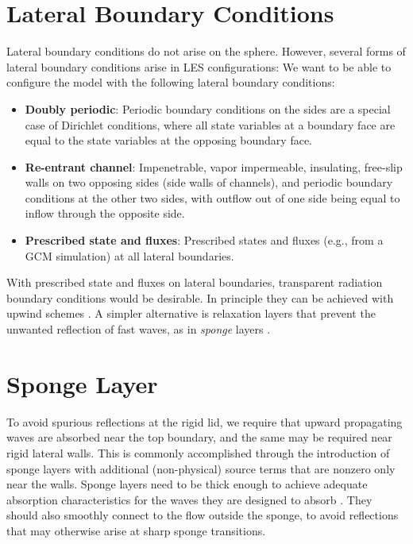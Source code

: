 \documentclass{report}
\begin{document}
\section{Lateral Boundary Conditions}

Lateral boundary conditions do not arise on the sphere. However, several forms of lateral boundary conditions arise in LES configurations: We want to be able to configure the model with the following lateral boundary conditions:
\begin{itemize}
    \item \textbf{Doubly periodic}: Periodic boundary conditions on the sides are a special case of Dirichlet conditions, where all state variables at a boundary face are equal to the state variables at the opposing boundary face.
    \item \textbf{Re-entrant channel}: Impenetrable, vapor impermeable, insulating, free-slip walls on two opposing sides (side walls of channels), and periodic boundary conditions at the other two sides, with outflow out of one side being equal to inflow through the opposite side. 
    \item \textbf{Prescribed state and fluxes}: Prescribed states and fluxes (e.g., from a GCM simulation) at all lateral boundaries. 
\end{itemize}
With prescribed state and fluxes on lateral boundaries, transparent radiation boundary conditions would be desirable. In principle they can be achieved with upwind schemes \citep{Davies14a}. A simpler alternative is relaxation layers that prevent the unwanted reflection of fast waves, as in \textit{sponge} layers \citep{Davies76a}.

\section{Sponge Layer}\label{s:sponge}

To avoid spurious reflections at the rigid lid, we require that upward propagating waves are absorbed near the top boundary, and the same may be required near rigid lateral walls. This is commonly accomplished through the introduction of sponge layers with additional (non-physical) source terms that are nonzero only near the walls. Sponge layers need to be thick enough to achieve adequate absorption characteristics for the waves they are designed to absorb \citep{durran:1983}. They should also smoothly connect to the flow outside the sponge, to avoid reflections that may otherwise arise at sharp sponge transitions. 
\end{document}
